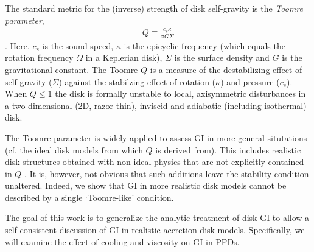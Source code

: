 \documentclass[iop, numberedappendix]{emulateapj}
\begin{document}
The standard metric for the (inverse) strength of disk self-gravity is the 
\emph{Toomre parameter}, 
\begin{align}\label{toomreQ_criterion}
  Q \equiv \frac{c_s\kappa}{\pi G \Sigma}  
\end{align}
\citep{toomre64}. Here, $c_s$ is the sound-speed,
$\kappa$ is the epicyclic frequency (which equals the rotation
frequency $\Omega$ in a Keplerian disk), $\Sigma$ is the surface
density and $G$ is the gravitational constant. The Toomre $Q$ is a
measure of the destabilizing effect of self-gravity ($\Sigma$) against 
the stabilzing effect of rotation ($\kappa$) and pressure
($c_s$). When $Q\leq 1$ the disk is formally unstable to local,
axisymmetric disturbances in a two-dimensional (2D, razor-thin),
inviscid and adiabatic (including isothermal) disk.  


The Toomre  parameter is widely applied to assess GI in more general 
situtations (cf. the ideal disk models from which $Q$ is derived
from).  This includes realistic disk structures
obtained with non-ideal physics that are not explicitly contained in
$Q$ \citep[e.g.][]{kimura12}.  It is, however, not obvious that such additions
leave the stability condition unaltered. Indeed, we show that GI in more
realistic disk models cannot be described by a single `Toomre-like' 
condition.   


The goal of this work is to generalize the analytic treatment of disk 
GI to allow a self-consistent discussion of GI in realistic accretion
disk models. Specifically, we will examine the effect of cooling and
viscosity on GI in PPDs.  

\end{document}
